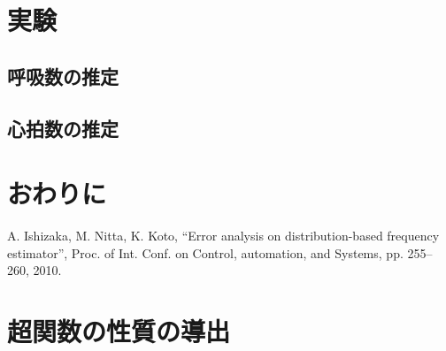 \documentclass{ieej}
\begin{document}
\section{実験}


\subsection{呼吸数の推定}

\subsection{心拍数の推定}


\section{おわりに}



\begin{thebibliography}{99}
  A. Ishizaka, M. Nitta, K. Koto, ``Error analysis on
	 distribution-based frequency estimator'', Proc. of
	 Int. Conf. on Control, automation, and Systems, pp. 255--260, 2010.

\end{thebibliography}

\appendix
\section{超関数の性質の導出}

\begin{biography}




\end{biography}
\end{document}
